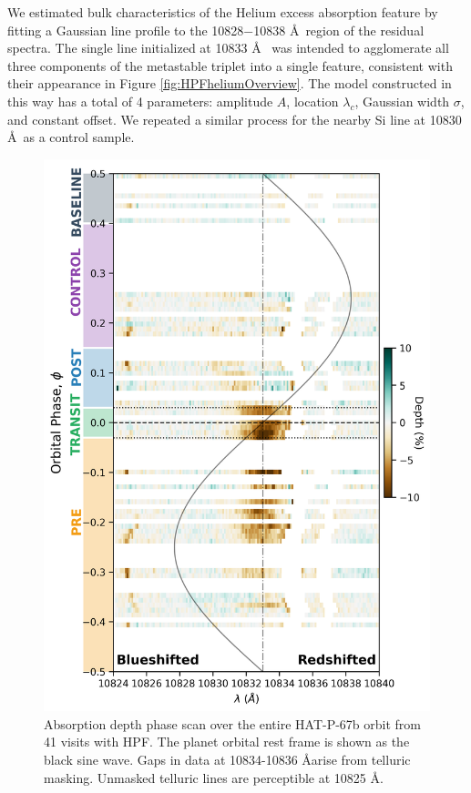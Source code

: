 \documentclass[twocolumn]{aastex631}
\begin{document}
We estimated bulk characteristics of the Helium excess absorption feature by fitting a Gaussian line profile to the 10828$-$10838 \AA~region of the residual spectra.  The single line initialized at 10833 \AA~ was intended to agglomerate all three components of the metastable triplet into a single feature, consistent with their appearance in Figure \ref{fig:HPFheliumOverview}.  The model constructed in this way has a total of 4 parameters: amplitude $A$, location $\lambda_c$, Gaussian width $\sigma$, and constant offset.  We repeated a similar process for the nearby Si line at 10830 \AA~as a control sample.

\begin{figure}
    \includegraphics[width=\linewidth]{figures/phase_2D_diagram_resid.png}
    \caption{Absorption depth phase scan over the entire HAT-P-67b orbit from 41 visits with HPF.  The planet orbital rest frame is shown as the black sine wave. Gaps in data at 10834-10836 \AA arise from telluric masking.  Unmasked telluric lines are perceptible at 10825 \AA.}
    \label{fig:HPFscanResid}
\end{figure}
\end{document}
